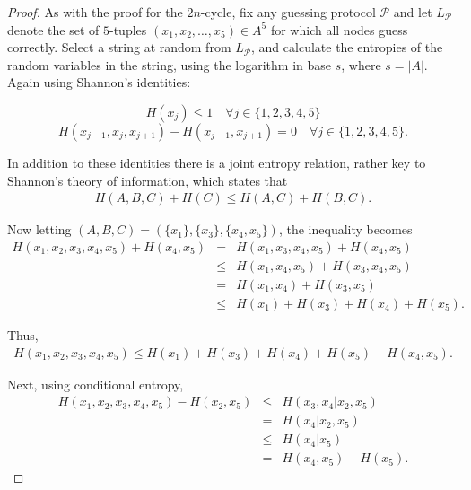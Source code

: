 \begin{proof}
 As with the proof for the $2n$-cycle, fix any guessing protocol $\mathcal{P}$ and let $L_\mathcal{P}$ denote the set of $5$-tuples $(x_1, x_2, \dots, x_5 ) \in A^5$ for which all nodes guess correctly. Select a string at random from $L_\mathcal{P}$, and calculate the entropies of the random variables in the string, using the logarithm in base $s$, where $s = |A|$. Again using Shannon's identities:

\[H(x_j) \leq 1 \quad \forall j \in \{1, 2, 3, 4, 5\} \]
\[H(x_{j - 1}, x_{j}, x_{j + 1}) - H(x_{j - 1}, x_{j + 1}) = 0 \quad \forall j \in \{1, 2, 3, 4, 5\}. \]

In addition to these identities there is a joint entropy relation, rather key to Shannon's theory of information, which states that
\begin{eqnarray}
 H(A, B, C) + H(C) \leq H(A, C) + H(B, C) \label{eqn:shannon}.
\end{eqnarray}

Now letting $(A, B, C) = ( \{ x_1 \}, \{ x_3 \}, \{ x_4, x_5 \} )$, the inequality becomes
\begin{eqnarray*}
 H(x_1, x_2, x_3, x_4, x_5) + H(x_4, x_5) & = & H(x_1, x_3, x_4, x_5) + H(x_4, x_5) \\
                                          & \leq & H(x_1, x_4, x_5) + H(x_3, x_4, x_5) \\
                                          & = & H(x_1, x_4) + H(x_3, x_5) \\
                                          & \leq & H(x_1) + H(x_3) + H(x_4) + H(x_5).
\end{eqnarray*}

Thus,
\begin{eqnarray}
 H(x_1, x_2, x_3, x_4, x_5) \leq H(x_1) + H(x_3) + H(x_4) + H(x_5) - H(x_4, x_5) \label{eqn:ineq1}.
\end{eqnarray}

Next, using conditional entropy,
\begin{eqnarray*}
 H(x_1, x_2, x_3, x_4, x_5) - H(x_2, x_5) & \leq & H(x_3, x_4 | x_2, x_5) \\
                                          & = & H(x_4 | x_2, x_5) \\
                                          & \leq & H(x_4|x_5) \\
                                          & = & H(x_4, x_5) - H(x_5).
\end{eqnarray*}


\end{proof}
